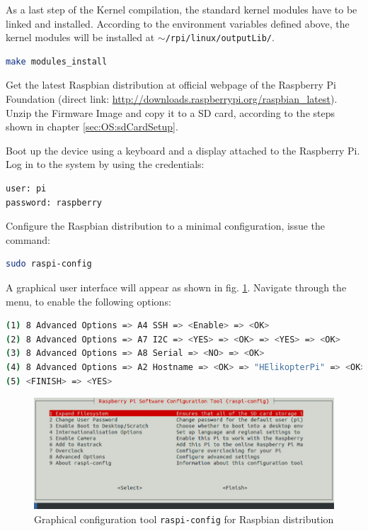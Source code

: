 As a last step of the Kernel compilation, the standard kernel modules have to be linked and installed. According to the environment variables defined above, the kernel modules will be installed at \texttt{$\sim$/rpi/linux/outputLib/}.
\begin{lstlisting}[language=bash,otherkeywords={make,dd,sudo}]
make modules_install
\end{lstlisting}

Get the latest Raspbian distribution at official webpage of the Raspberry Pi Foundation (direct link: \url{http://downloads.raspberrypi.org/raspbian_latest}).\\
Unzip the Firmware Image and copy it to a SD card, according to the steps shown in chapter \ref{sec:OS:sdCardSetup}.

Boot up the device using a keyboard and a display attached to the Raspberry Pi. Log in to the system by using the credentials:
\begin{lstlisting}[language=bash,otherkeywords={make,scp,dd,sudo}]
user: pi
password: raspberry
\end{lstlisting}

Configure the Raspbian distribution to a minimal configuration, issue the command:
\begin{lstlisting}[language=bash,otherkeywords={make,scp,dd,sudo}]
sudo raspi-config
\end{lstlisting}

A graphical user interface will appear as shown in fig. \ref{fig:OS:preemptRtPatch:raspiConfig}. Navigate through the menu, to enable the following options:
\begin{lstlisting}[language=bash,otherkeywords={make,scp,dd,sudo}]
(1) 8 Advanced Options => A4 SSH => <Enable> => <OK>
(2) 8 Advanced Options => A7 I2C => <YES> => <OK> => <YES> => <OK>
(3) 8 Advanced Options => A8 Serial => <NO> => <OK>
(4) 8 Advanced Options => A2 Hostname => <OK> => "HElikopterPi" => <OK>
(5) <FINISH> => <YES>
\end{lstlisting}

\begin{figure}[H]
    \centering
    \includegraphics[width=\textwidth]{fig/ch-rt-linux-os/raspiConfig}
    \caption{Graphical configuration tool \texttt{raspi-config} for Raspbian distribution}
    \label{fig:OS:preemptRtPatch:raspiConfig}
\end{figure}

